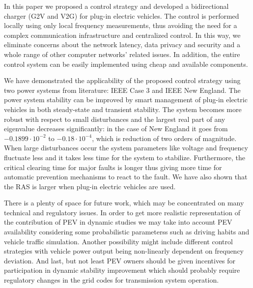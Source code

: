 \documentclass[final,12pt]{elsarticle}
\begin{document}
In this paper we proposed a control strategy 
and developed a bidirectional charger (G2V and V2G) for plug-in
electric vehicles.
The control is performed locally using only local frequency measurements, thus avoiding the
need for a complex communication infrastructure and centralized control. In this
way, we eliminate concerns about the network latency, data privacy and security
and a whole range of other computer networks' related issues.  In addition, the
entire control system can be easily implemented using cheap and available
components.

We have demonstrated the applicability of the proposed control strategy using
two power systems from literature: IEEE Case 3 and IEEE New England. The power
system stability can be improved by smart management of plug-in electric
vehicles in both steady-state and transient stability. The system becomes more
robust with respect to small disturbances and the largest real part of any
eigenvalue decreases significantly: in the case of New England it goes from
$-0.1899 \cdot 10^{-2}$ to $-0.18 \cdot 10^{-4}$, which is reduction of two
orders of magnitude. When large disturbances occur the system parameters like
voltage and frequency fluctuate less and it takes less time for the system to stabilize.
Furthermore, the critical clearing time for major faults is longer thus giving
more time for automatic prevention mechanisms to react to the fault.  We have
also shown that the RAS is larger when plug-in electric vehicles are
used.

There is a plenty of space for future work, which may be concentrated on many
technical and regulatory issues. In order to get more realistic representation
of the contribution of PEV in dynamic studies we may take into account PEV
availability considering some probabilistic parameterss such as driving habits
and vehicle traffic simulation. Another possibility might include different
control strategies with vehicle power output being non-linearly dependent on
frequency deviation. And last, but not least PEV owners should be given
incentives for participation in dynamic stability improvement which should
probably require regulatory changes in the grid codes for transmission system
operation.
\end{document}

